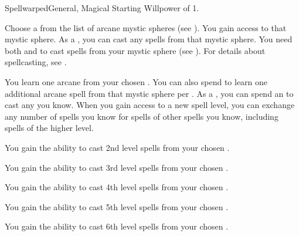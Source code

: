     \begin{feat}{Spellwarped}{General, Magical}
        \featpre Starting Willpower of 1.

         Choose a  from the list of arcane mystic spheres (see ).
        You gain access to that mystic sphere.
        As a , you can cast any  spells from that mystic sphere.
        You need both  and  to cast spells from your mystic sphere (see ).
        For details about spellcasting, see .

         You learn one arcane  from your chosen .
        You can also spend  to learn one additional arcane spell from that mystic sphere per .
        As a , you can spend an  to cast any  you know.
        When you gain access to a new spell level, you can exchange any number of spells you know for spells of other spells you know, including spells of the higher level.

         You gain the ability to cast 2nd level spells from your chosen .

         You gain the ability to cast 3rd level spells from your chosen .

         You gain the ability to cast 4th level spells from your chosen .

         You gain the ability to cast 5th level spells from your chosen .

         You gain the ability to cast 6th level spells from your chosen .
    \end{feat}

